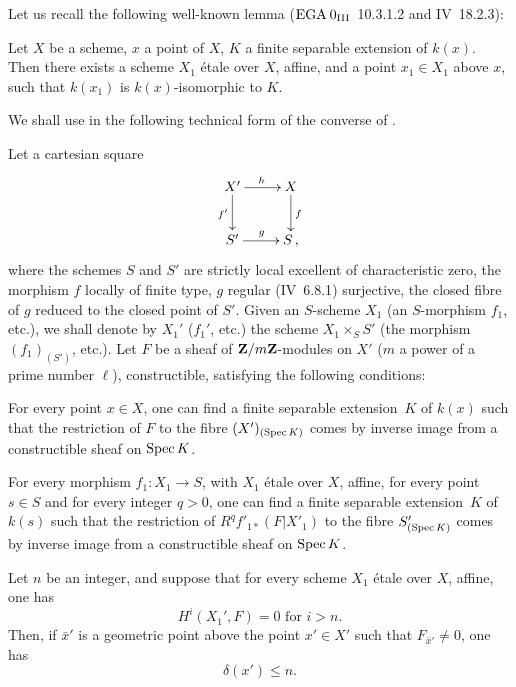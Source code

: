 Let us recall the following well-known lemma (\cf $\textup{EGA}\kern.2em 0_{\textup{III}}$~10.3.1.2 and \EGA IV~18.2.3):

\begin{lemma} \label{XIV.3.4}
Let $X$ be a scheme, $x$ a point of $X$, $K$ a finite separable extension of $k(x)$. Then there exists a scheme $X_1$ \'etale over $X$, affine, and a point $x_1 \in X_1$ above $x$, such that $k(x_1)$ is $k(x)$-isomorphic to $K$.
\end{lemma}

We shall use in \numero {} the following technical form of the converse of .

\begin{proposition} \label{XIV.3.5}
Let a cartesian square
$$
\xymatrix{
{X'}\ar[r]^h\ar[d]_{f'} &{X}\ar[d]^f\\
{S'}\ar[r]^g &{S}\,,
}
$$
where the schemes $S$ and $S'$ are strictly local excellent of characteristic zero, the morphism $f$ locally of finite type, $g$ regular (\textup{\EGA IV~6.8.1}) surjective, the closed fibre of $g$ reduced to the closed point of $S'$. Given an $S$-scheme $X_1$ (\resp an $S$-morphism $f_1$, etc.), we shall denote by $X_1'$ (\resp $f_1'$, etc.) the scheme $X_1 \times_S S'$ (\resp the morphism $(f_1)_{(S')}$, etc.). Let $F$ be a sheaf of $\mathbf{Z}/m\mathbf{Z}$-modules on $X'$ ($m$ a power of a prime number $\ell$), constructible, satisfying the following conditions:
\begin{enumeratei}
\item
For every point $x \in X$, one can find a finite separable extension~$K$ of $k(x)$ such that the restriction of $F$ to the fibre $(X')_{(\operatorname{Spec} K)}$ comes by inverse image from a constructible sheaf on $\operatorname{Spec} K$.
\item
For every morphism $f_1: X_1 \to S$, with $X_1$ \'etale over $X$, affine, for every point $s \in S$ and for every integer $q>0$, one can find a finite separable extension~$K$ of $k(s)$ such that the restriction of $R^q f'_{1*}(F|X'_1)$ to the fibre $S'_{(\operatorname{Spec} K)}$ comes by inverse image from a constructible sheaf on $\operatorname{Spec} K$.
\end{enumeratei}

Let $n$ be an integer, and suppose that for every scheme $X_1$ \'etale over $X$, affine, one has
$$
H^i(X_1', F)=0 \text{ for } i>n.
$$
Then, if $\bar{x}'$ is a geometric point above the point $x' \in X'$ such that $F_{\bar{x}'} \neq 0$, one has
$$
\delta(x') \leq n.
$$
\end{proposition}

